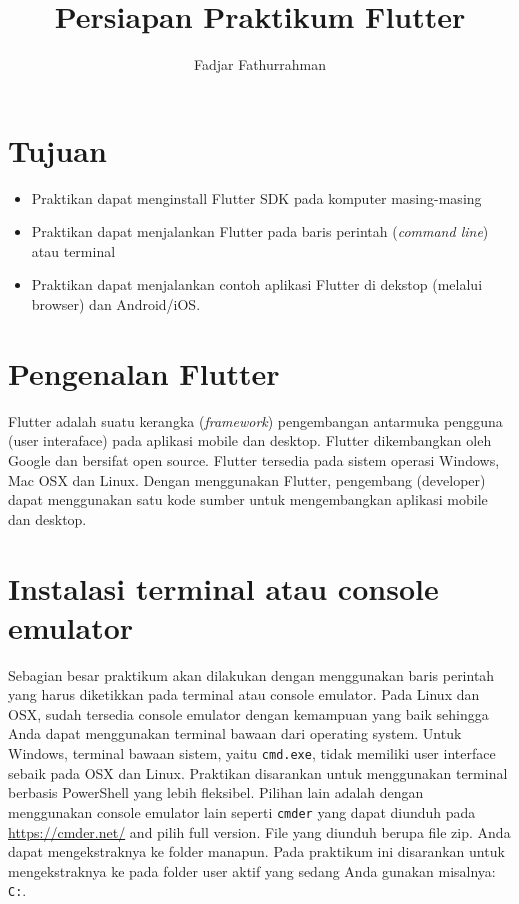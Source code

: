 \documentclass[a4paper,11pt]{article} %
\newcommand{\txtinline}[1]{\texttt{#1}}
\begin{document}
\title{Persiapan Praktikum Flutter}
\author{Fadjar Fathurrahman}
\date{}
\maketitle

\section{Tujuan}

\begin{itemize}
\item Praktikan dapat menginstall Flutter SDK pada komputer masing-masing
\item Praktikan dapat menjalankan Flutter pada baris perintah (\textit{command line})
atau terminal
\item Praktikan dapat menjalankan contoh aplikasi Flutter di dekstop (melalui browser)
dan Android/iOS.
\end{itemize}

\section{Pengenalan Flutter}

Flutter adalah suatu kerangka (\textit{framework}) pengembangan antarmuka
pengguna (user interaface) pada aplikasi mobile dan desktop. Flutter dikembangkan
oleh Google dan bersifat open source. Flutter tersedia pada sistem operasi Windows,
Mac OSX dan Linux. Dengan menggunakan Flutter, pengembang (developer) dapat menggunakan
satu kode sumber untuk mengembangkan aplikasi mobile dan desktop.

\section{Instalasi terminal atau console emulator}

Sebagian besar praktikum akan dilakukan dengan menggunakan baris perintah
yang harus diketikkan pada terminal atau console emulator.
Pada Linux dan OSX, sudah tersedia console emulator dengan kemampuan yang baik
sehingga Anda dapat menggunakan terminal bawaan dari operating system.
Untuk Windows, terminal bawaan sistem, yaitu \txtinline{cmd.exe}, tidak memiliki
user interface sebaik pada OSX dan Linux. Praktikan disarankan untuk menggunakan
terminal berbasis PowerShell yang lebih fleksibel. Pilihan lain adalah dengan
menggunakan console emulator lain seperti \txtinline{cmder} yang dapat diunduh
pada {\footnotesize\url{https://cmder.net/}} and pilih full version.
File yang diunduh berupa file zip. Anda dapat mengekstraknya ke folder manapun.
Pada praktikum ini disarankan untuk mengekstraknya ke pada folder user aktif yang
sedang Anda gunakan misalnya:
\txtinline{C:\Users\username\cmder}.
\end{document}
